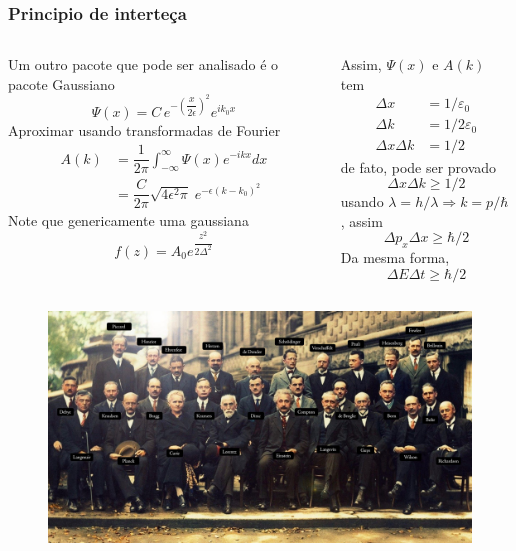 \documentclass[12pt,brazil]{beamer}
\begin{document}
    
\begin{frame}
  \frametitle{Principio de interteça}
        \fontsize{10pt}{10pt}\selectfont
    \begin{columns}[c]

  \column{5cm}
    Um outro pacote que pode ser analisado é o pacote Gaussiano
    \[
     \Psi (x) = C\,e^{-\left(\dfrac{x}{2\epsilon}\right)^2}e^{ik_0x}
    \]
    Aproximar usando transformadas de Fourier
    \[
      \begin{align*}
        A(k) &= \dfrac{1}{2\pi} \int_{-\infty}^\infty  \Psi (x) e^{-ikx}dx\\
        &= \dfrac{C}{2\pi} \sqrt{4\epsilon^2\pi}\;e^{-\epsilon\left( k - k_0\right)^2}
      \end{align*}
    \]
    Note que genericamente uma gaussiana
    \[
     f(z) = A_0e^{\dfrac{z^2}{2\Delta^2} }
    \]
    
    \column{5cm}
    
    Assim, $\Psi (x)$ e $A(k)$ tem
    \[
      \begin{align*}
        \Delta x &= 1/\varepsilon_0\\
        \Delta k &= 1/2\varepsilon_0\\
        \Delta x \Delta k &= 1/2
      \end{align*}
    \]
    de fato, pode ser provado
    \[
      \Delta x \Delta k \geq 1/2
    \]
    usando $\lambda = h/\lambda \Rightarrow k = p/\hbar$, assim
    \[
     \Delta p_x \Delta x \geq \hbar/2
    \]
    Da mesma forma,
    \[
     \Delta E \Delta t \geq \hbar/2
    \]

  \end{columns}
\end{frame}

\begin{frame}
  \begin{figure}
    \includegraphics[width=12cm]{figuras/fig15a}
  \end{figure}
\end{frame}
\end{document}

